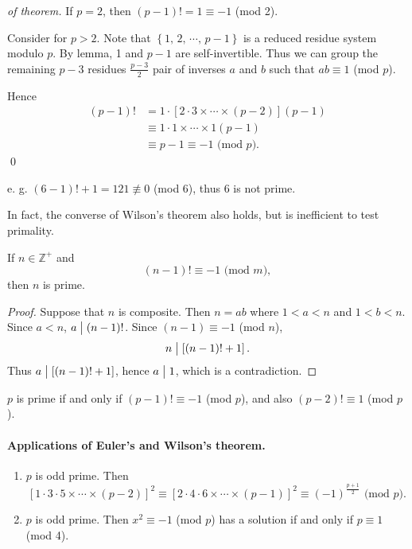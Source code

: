 \begin{proof}[of theorem]
    If $p=2$, then $\left(p-1\right)!=1\equiv-1$ (mod 2).

    Consider for $p>2$. Note that $\left\{1,\,2,\,\cdots,\,p-1\right\}$ is a reduced
    residue system modulo $p$. By lemma, 1 and $p-1$ are self-invertible.
    Thus we can group the remaining $p-3$ residues
    $\frac{p-3}{2}$ pair of inverses $a$ and $b$ such that $ab \equiv 1$ (mod $p$).

    Hence
    \begin{align*}
        \left(p-1\right)!&=1\cdot\left[2\cdot3\times\cdots\times\left(p-2\right)\right]\left(p-1\right)\\
        &\equiv 1\cdot1\times\cdots\times1\left(p-1\right) \\
        &\equiv p-1 \equiv -1 \mbox{ (mod $p$)}.
    \end{align*}
    \qed
\end{proof}

e. g. $\left(6-1\right)!+1=121\not\equiv 0$ (mod 6), thus 6 is not prime.

In fact, the converse of Wilson's theorem also holds,
but is inefficient to test primality.

\begin{theorem}
    If $n\in\mathbb{Z}^+$ and
    \[
        \left(n-1\right)!\equiv -1 \mbox{ (mod $m$)},
    \]
    then $n$ is prime.
\end{theorem}

\begin{proof}
    Suppose that $n$ is composite. Then $n=ab$ where $1<a<n$ and $1<b<n$.
    Since $a<n$, $a \bigm| \left(n-1\right)!$.
    Since $\left(n-1\right)\equiv -1$ (mod $n$),
    \[
        n \bigm| \left[\left(n-1\right)!+1\right].
    \]
    Thus $a \bigm| \left[\left(n-1\right)!+1\right]$, hence $a \bigm| 1$,
    which is a contradiction.
\end{proof}

\begin{remark}
    $p$ is prime if and only if $\left(p-1\right)! \equiv -1$ (mod $p$),
    and also $\left(p-2\right)! \equiv 1$ (mod $p$).
\end{remark}

\paragraph{Applications of Euler's and Wilson's theorem.}
\begin{enumerate}
    \item $p$ is odd prime. Then 
    \[
        \left[1\cdot 3\cdot 5 \times \cdots \times \left(p-2\right)\right]^2
        \equiv \left[2\cdot 4\cdot 6 \times \cdots \times \left(p-1\right)\right]^2
        \equiv \left(-1\right)^{\frac{p+1}{2}} \mbox{ (mod $p$)}.
    \]
    \item $p$ is odd prime. Then $x^2 \equiv -1$ (mod $p$)
    has a solution if and only if $p \equiv 1$ (mod 4).
\end{enumerate}